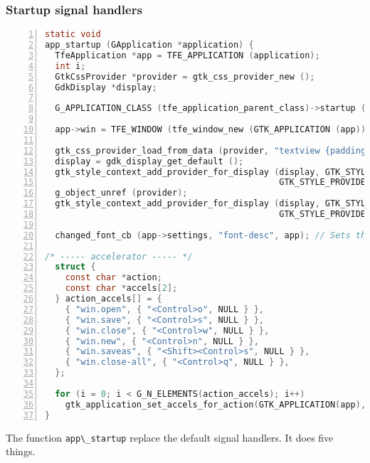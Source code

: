 \subsubsection{Startup signal handlers}\label{startup-signal-handlers}

\begin{lstlisting}[language=C, numbers=left]
static void
app_startup (GApplication *application) {
  TfeApplication *app = TFE_APPLICATION (application);
  int i;
  GtkCssProvider *provider = gtk_css_provider_new ();
  GdkDisplay *display;

  G_APPLICATION_CLASS (tfe_application_parent_class)->startup (application);

  app->win = TFE_WINDOW (tfe_window_new (GTK_APPLICATION (app)));

  gtk_css_provider_load_from_data (provider, "textview {padding: 10px;}", -1);
  display = gdk_display_get_default ();
  gtk_style_context_add_provider_for_display (display, GTK_STYLE_PROVIDER (provider),
                                              GTK_STYLE_PROVIDER_PRIORITY_APPLICATION);
  g_object_unref (provider);
  gtk_style_context_add_provider_for_display (display, GTK_STYLE_PROVIDER (app->provider),
                                              GTK_STYLE_PROVIDER_PRIORITY_APPLICATION);

  changed_font_cb (app->settings, "font-desc", app); // Sets the text view font to the font from the gsettings data base.

/* ----- accelerator ----- */ 
  struct {
    const char *action;
    const char *accels[2];
  } action_accels[] = {
    { "win.open", { "<Control>o", NULL } },
    { "win.save", { "<Control>s", NULL } },
    { "win.close", { "<Control>w", NULL } },
    { "win.new", { "<Control>n", NULL } },
    { "win.saveas", { "<Shift><Control>s", NULL } },
    { "win.close-all", { "<Control>q", NULL } },
  };

  for (i = 0; i < G_N_ELEMENTS(action_accels); i++)
    gtk_application_set_accels_for_action(GTK_APPLICATION(app), action_accels[i].action, action_accels[i].accels);
}
\end{lstlisting}

The function \passthrough{\lstinline!app\_startup!} replace the default
signal handlers. It does five things.

